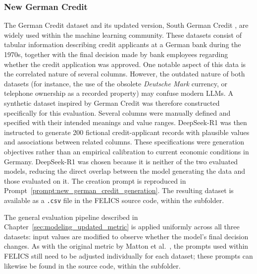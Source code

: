 \subsubsection{New German Credit}
\label{sec:new_german_credit_dataset}
The German Credit dataset and its updated version, South German Credit \cite{grompingSouthGermanCredit2019}, are widely used within the machine learning community. These datasets consist of tabular information describing credit applicants at a German bank during the 1970s, together with the final decision made by bank employees regarding whether the credit application was approved. One notable aspect of this data is the correlated nature of several columns. However, the outdated nature of both datasets (for instance, the use of the obsolete \emph{Deutsche Mark} currency, or telephone ownership as a recorded property) may confuse modern LLMs. A synthetic dataset inspired by German Credit was therefore constructed specifically for this evaluation. Several columns were manually defined and specified with their intended meanings and value ranges. DeepSeek-R1 was then instructed to generate 200 fictional credit-applicant records with plausible values and associations between related columns. These specifications were generation objectives rather than an empirical calibration to current economic conditions in Germany. DeepSeek-R1 was chosen because it is neither of the two evaluated models, reducing the direct overlap between the model generating the data and those evaluated on it. The creation prompt is reproduced in Prompt~\ref{prompt:new_german_credit_generation}. The resulting dataset is available as a \texttt{.csv} file in the FELICS source code, within the  subfolder.

The general evaluation pipeline described in Chapter~\ref{sec:modeling_updated_metric} is applied uniformly across all three datasets: input values are modified to observe whether the model's final decision changes. As with the original metric by Matton et al.~\cite{mattonWalkTalkMeasuring2024}, the prompts used within FELICS still need to be adjusted individually for each dataset; these prompts can likewise be found in the source code, within the  subfolder.

